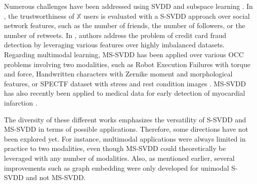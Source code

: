 Numerous challenges have been addressed using SVDD and subspace learning \cite{laakom2023convolutional, kilickaya2023hyperspectral, al2024malware}. In \cite{trustworthiness2024}, the trustworthiness of $\mathbb{X}$ users is evaluated with a S-SVDD approach over social network features, such as the number of friends, the number of followers, or the number of retweets. In \cite{10372038}, authors address the problem of credit card fraud detection by leveraging various features over highly imbalanced datasets. Regarding multimodal learning, MS-SVDD has been applied over various OCC problems involving two modalities, such as Robot Execution Failures with torque and force, Handwritten characters with Zernike moment and morphological features, or SPECTF dataset with stress and rest condition images \cite{SOHRAB2021107648}. MS-SVDD has also recently been applied to medical data for early detection of myocardial infarction \cite{10081907,zahid2024refining}. 

The diversity of these different works emphasizes the versatility of S-SVDD and MS-SVDD in terms of possible applications. Therefore, some directions have not been explored yet. For instance, multimodal applications were always limited in practice to two modalities, even though MS-SVDD could theoretically be leveraged with any number of modalities. Also, as mentioned earlier, several improvements such as graph embedding were only developed for unimodal S-SVDD and not MS-SVDD. %